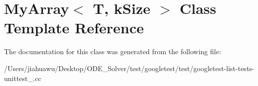 \hypertarget{class_my_array}{}\section{My\+Array$<$ T, k\+Size $>$ Class Template Reference}
\label{class_my_array}


The documentation for this class was generated from the following file\+:\begin{DoxyCompactItemize}
\item 
/\+Users/jiahuawu/\+Desktop/\+O\+D\+E\+\_\+\+Solver/test/googletest/test/googletest-\/list-\/tests-\/unittest\+\_\+.\+cc\end{DoxyCompactItemize}
